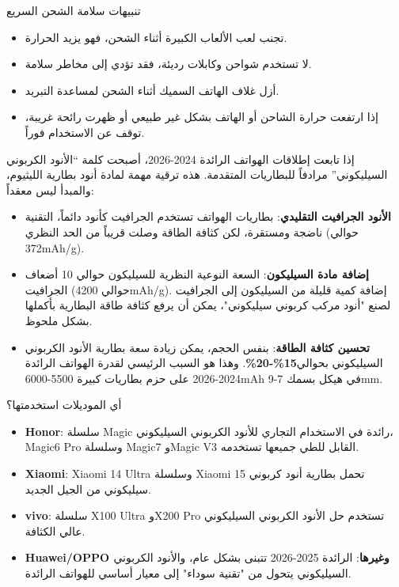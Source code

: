 \begin{tcbwarn}{تنبيهات سلامة الشحن السريع}
\begin{itemize}
  \item تجنب لعب الألعاب الكبيرة أثناء الشحن، فهو يزيد الحرارة.
  \item لا تستخدم شواحن وكابلات رديئة، فقد تؤدي إلى مخاطر سلامة.
  \item أزل غلاف الهاتف السميك أثناء الشحن لمساعدة التبريد.
  \item إذا ارتفعت حرارة الشاحن أو الهاتف بشكل غير طبيعي أو ظهرت رائحة غريبة، توقف عن الاستخدام فوراً.
\end{itemize}

\end{tcbwarn}


إذا تابعت إطلاقات الهواتف الرائدة 2024-2026، أصبحت كلمة “الأنود الكربوني السيليكوني” مرادفاً للبطاريات المتقدمة. هذه ترقية مهمة لمادة أنود بطارية الليثيوم، والمبدأ ليس معقداً:

\begin{itemize}
  \item \textbf{الأنود الجرافيت التقليدي}: بطاريات الهواتف تستخدم الجرافيت كأنود دائماً، التقنية ناضجة ومستقرة، لكن كثافة الطاقة وصلت قريباً من الحد النظري (حوالي 372mAh/g).
  \item \textbf{إضافة مادة السيليكون}: السعة النوعية النظرية للسيليكون حوالي 10 أضعاف الجرافيت (حوالي 4200mAh/g). إضافة كمية قليلة من السيليكون إلى الجرافيت لصنع "أنود مركب كربوني سيليكوني"، يمكن أن يرفع كثافة طاقة البطارية بأكملها بشكل ملحوظ.
  \item \textbf{تحسين كثافة الطاقة}: بنفس الحجم، يمكن زيادة سعة بطارية الأنود الكربوني السيليكوني بحوالي\textbf{15\%-20\%}. وهذا هو السبب الرئيسي لقدرة الهواتف الرائدة 2024-2026 على حزم بطاريات كبيرة 5500-6000mAh في هيكل بسمك 7-9mm.
\end{itemize}

\begin{tcbinfo}{أي الموديلات استخدمتها؟}
\begin{itemize}
  \item \textbf{Honor}: سلسلة Magic رائدة في الاستخدام التجاري للأنود الكربوني السيليكوني، Magic6 Pro وسلسلة Magic7 وMagic V3 القابل للطي جميعها تستخدمه.
  \item \textbf{Xiaomi}: Xiaomi 14 Ultra وسلسلة Xiaomi 15 تحمل بطارية أنود كربوني سيليكوني من الجيل الجديد.
  \item \textbf{vivo}: سلسلة X100 Ultra وX200 Pro تستخدم حل الأنود الكربوني السيليكوني عالي الكثافة.
  \item \textbf{Huawei/OPPO وغيرها}: الرائدة 2025-2026 تتبنى بشكل عام، والأنود الكربوني السيليكوني يتحول من "تقنية سوداء" إلى معيار أساسي للهواتف الرائدة.
\end{itemize}

\end{tcbinfo}

